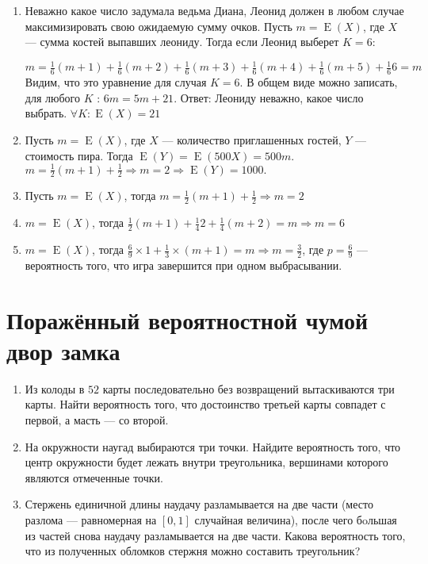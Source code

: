 \documentclass[a4paper,12pt]{article}
\DeclareMathOperator{\E}{E}
\begin{document}
\begin{enumerate}
\item Неважно какое число задумала ведьма Диана, Леонид должен в любом случае максимизировать свою ожидаемую сумму очков. 
Пусть $m =\E(X)$, где $X$ — сумма костей выпавших леониду. Тогда если Леонид выберет $K = 6$:

$m =\frac{1}{6}(m+1) + \frac{1}{6}(m+2) + \frac{1}{6}(m+3) + \frac{1}{6}(m+4) + \frac{1}{6}(m+5) + \frac{1}{6} 6 = m$ Видим, что это уравнение для случая $K = 6$. В общем виде можно записать, для любого $K$ : $6m = 5m + 21$. Ответ: Леониду неважно, какое число выбрать. $\forall K:  \E(X) = 21$
\item Пусть $m = \E(X)$, где $X$ — количество приглашенных гостей, $Y$ — стоимость пира. Тогда $\E(Y) = \E(500  X) = 500 m$. $m = \frac{1}{2}(m+1) + \frac{1}{2} \Rightarrow m = 2 \Rightarrow \E(Y) = 1000.$
\item Пусть $m = \E(X)$, тогда $m = \frac{1}{2}(m+1) + \frac{1}{2} \Rightarrow m = 2$
\item $m = \E(X)$, тогда $\frac{1}{2}(m+1) + \frac{1}{4} 2 + \frac{1}{4}(m+2)=m \Rightarrow m = 6$
\item $m = \E(X)$, тогда $\frac{6}{9} \times 1 + \frac{1}{3} \times (m+1) = m \Rightarrow m = \frac{3}{2}$, где $p = \frac{6}{9}$  — вероятность того, что игра завершится при одном выбрасывании.
\end{enumerate}




\newpage
\section{Поражённый вероятностной чумой двор замка}

\begin{enumerate}
\item %

Из колоды в $52$ карты последовательно без возвращений вытаскиваются три карты. Найти вероятность того, что достоинство третьей карты совпадет с первой, а масть — со второй.

\item %

На окружности наугад выбираются три точки. Найдите вероятность того, что центр окружности будет лежать внутри треугольника, вершинами которого являются отмеченные точки.

\item

Стержень единичной длины наудачу разламывается на две части (место разлома — равномерная на $[0,1]$ случайная величина), после чего бoльшая из частей снова наудачу разламывается на две части. Какова вероятность того, что из полученных обломков стержня можно составить треугольник?
\end{enumerate}
\end{document}
